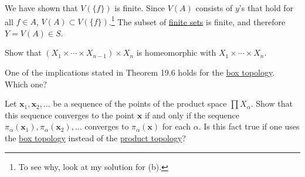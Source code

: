 \begin{solution}[e]
\begin{enumerate}
      We have shown that $V(\{f\})$ is finite. Since $V(A)$ consists of $y$'s that hold for all $f \in A$, $V(A) \subset V(\{f\})$.\footnote{To see why, look at my solution for (b).} The subset of \hyperref[st-def:finite-set]{finite sets} is finite, and therefore $Y = V(A) \in S$. 
    \end{enumerate}
  \end{solution}

  \begin{exercise}[Munkres 19.4]
    Show that $(X_1 \times \cdots \times X_{n-1}) \times X_n$ is homeomorphic with $X_1 \times \cdots \times X_n$.
  \end{exercise}

  \begin{exercise}[Munkres 19.5]
    One of the implications stated in Theorem 19.6 holds for the \hyperref[def:box-topology]{box topology}. Which one?
  \end{exercise}

  \begin{exercise}[Munkres 19.6]
    Let $\mathbf{x}_1, \mathbf{x}_2, \ldots$ be a sequence of the points of the product space $\prod X_\alpha$. Show that this sequence converges to the point $\mathbf{x}$ if and only if the sequence $\pi_\alpha(\mathbf{x}_1), \pi_\alpha(\mathbf{x}_2), \ldots$ converges to $\pi_\alpha(\mathbf{x})$ for each $\alpha$. Is this fact true if one uses the \hyperref[def:box-topology]{box topology} instead of the \hyperref[def:product-topology]{product topology}?
  \end{exercise}

